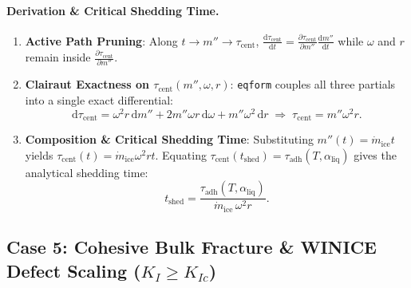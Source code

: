 \documentclass[11pt,a4paper]{article}
\newcommand{\dd}{\mathrm{d}}
\newcommand{\pd}[2]{\frac{\partial #1}{\partial #2}}
\newcommand{\td}[2]{\frac{\dd #1}{\dd #2}}
\begin{document}
\begin{center}
\end{center}

\paragraph{Derivation \& Critical Shedding Time.}
\begin{enumerate}[leftmargin=1.5em,itemsep=2pt]
  \item \textbf{Active Path Pruning}: Along $t \to m'' \to \tau_{\text{cent}}$, $\td{\tau_{\text{cent}}}{t} = \pd{\tau_{\text{cent}}}{m''}\td{m''}{t}$ while $\omega$ and $r$ remain inside $\pd{\tau_{\text{cent}}}{m''}$.
  \item \textbf{Clairaut Exactness on $\tau_{\text{cent}}(m'',\omega,r)$}: \texttt{eqform} couples all three partials into a single exact differential:
  \begin{equation}
    \dd\tau_{\text{cent}} = \omega^2 r\,\dd m'' + 2 m''\omega r\,\dd\omega + m''\omega^2\,\dd r
    \;\Longrightarrow\;
    \tau_{\text{cent}} = m'' \omega^2 r.
  \end{equation}
  \item \textbf{Composition \& Critical Shedding Time}: Substituting $m''(t) = \dot{m}_{\text{ice}} t$ yields $\tau_{\text{cent}}(t) = \dot{m}_{\text{ice}}\omega^2 r t$. Equating $\tau_{\text{cent}}(t_{\text{shed}}) = \tau_{\text{adh}}(T, \alpha_{\text{liq}})$ gives the analytical shedding time:
  \begin{equation}
    t_{\text{shed}} = \frac{\tau_{\text{adh}}(T, \alpha_{\text{liq}})}{\dot{m}_{\text{ice}}\,\omega^2 r}.
  \end{equation}
\end{enumerate}

\subsection{Case 5: Cohesive Bulk Fracture \& WINICE Defect Scaling ($K_I \ge K_{Ic}$)}
\end{document}
